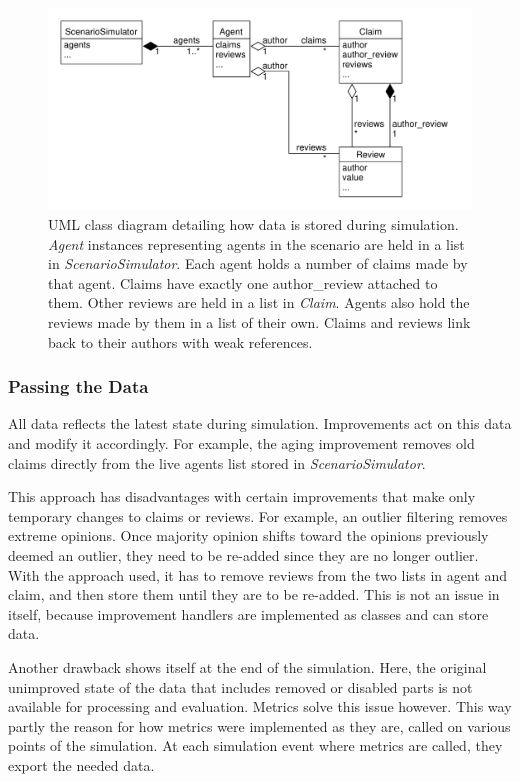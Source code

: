\documentclass[%
    ]{\PathToTumTemplate/thesis/tum_thesis}
\begin{document}
\begin{figure}[tbp]
  \begin{center}
        \includegraphics[width=1\linewidth]	{../uml/agents_data_structure.pdf}
    \caption{
	UML class diagram detailing how data is stored during simulation.
	\emph{Agent} instances representing agents in the scenario are held in a list in \emph{ScenarioSimulator}.
	Each agent holds a number of claims made by that agent.
	Claims have exactly one \gls{author_review} attached to them.
	Other reviews are held in a list in \emph{Claim}.
	Agents also hold the reviews made by them in a list of their own.
	Claims and reviews link back to their authors with weak references.
    }
    \label{fig:agents_data_structure}
  \end{center}
\end{figure}

\subsubsection{Passing the Data}
All data reflects the latest state during simulation.
Improvements act on this data and modify it accordingly.
For example, the aging improvement removes old claims directly from the live agents list stored in \emph{ScenarioSimulator}.

This approach has disadvantages with certain improvements that make only temporary changes to claims or reviews.
For example, an outlier filtering removes extreme opinions.
Once majority opinion shifts toward the opinions previously deemed an outlier, they need to be re-added since they are no longer outlier.
With the approach used, it has to remove reviews from the two lists in agent and claim, and then store them until they are to be re-added.
This is not an issue in itself, because improvement handlers are implemented as classes and can store data.

Another drawback shows itself at the end of the simulation.
Here, the original unimproved state of the data that includes removed or disabled parts is not available for processing and evaluation.
Metrics solve this issue however.
This way partly the reason for how metrics were implemented as they are, called on various points of the simulation.
At each simulation event where metrics are called, they export the needed data.
\end{document}
